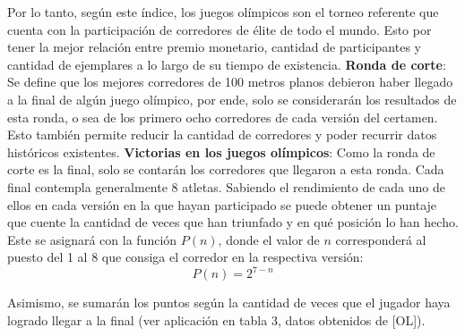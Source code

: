 \documentclass[a4paper]{article}
\begin{document}
\newline Por lo tanto, según este índice, los juegos olímpicos son el torneo referente que cuenta con la participación de corredores de élite de todo el mundo. Esto por tener la mejor relación entre premio monetario, cantidad de participantes y cantidad de ejemplares a lo largo de su tiempo de existencia. \newline \newline \textbf{Ronda de corte}: Se define que los mejores corredores de 100 metros planos debieron haber llegado a la final de algún juego olímpico, por ende, solo se considerarán los resultados de esta ronda, o sea de los primero ocho corredores de cada versión del certamen. Esto también permite reducir la cantidad de corredores y poder recurrir datos históricos existentes. \newline\newline \textbf{Victorias en los juegos olímpicos}:
Como la ronda de corte es la final, solo se contarán los corredores que llegaron a esta ronda. Cada final contempla generalmente 8 atletas. Sabiendo el rendimiento de cada uno de ellos en cada versión en la que hayan participado se puede obtener un puntaje que cuente la cantidad de veces que han triunfado y en qué posición lo han hecho. Este se asignará con la función $P(n)$, donde el valor de $n$ corresponderá al puesto del 1 al 8 que consiga el corredor en la respectiva versión:
\begin{equation*}
    P(n) = 2^{7-n}
\end{equation*}

Asimismo, se sumarán los puntos según la cantidad de veces que el jugador haya logrado llegar a la final (ver aplicación en tabla 3, datos obtenidos de [OL]). 
\end{document}
